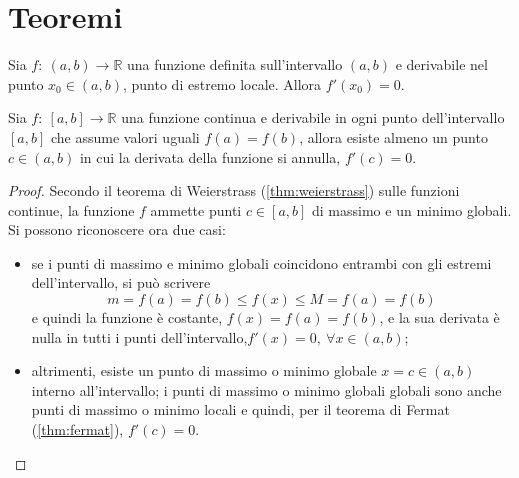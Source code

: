 \section{Teoremi}
\begin{theorem}\label{thm:fermat} Sia $f: \ (a,b) \rightarrow \mathbb{R}$ una funzione definita sull'intervallo $(a,b)$ e derivabile nel punto $x_0 \in (a,b)$, punto di estremo locale. Allora $f'(x_0) = 0$.
\end{theorem}

\begin{theorem}\label{thm:rolle} Sia $f: \ [a,b] \rightarrow \mathbb{R}$ una funzione continua e derivabile in ogni punto dell'intervallo $[a,b]$ che assume valori uguali $f(a) = f(b)$, allora esiste almeno un punto $c \in (a,b)$ in cui la derivata della funzione si annulla, $f'(c) = 0$.
\end{theorem}
\begin{proof}
    Secondo il teorema di Weierstrass (\ref{thm:weierstrass}) sulle funzioni continue, la funzione $f$ ammette punti $c \in [a,b]$ di massimo e un minimo globali. Si possono riconoscere ora due casi:
    \begin{itemize}
        \item se i punti di massimo e minimo globali coincidono entrambi con gli estremi dell'intervallo, si può scrivere
            \begin{equation} m = f(a) = f(b) \le f(x) \le M = f(a) = f(b) \end{equation}
                e quindi la funzione è costante, $f(x) = f(a) = f(b)$, e la sua derivata è nulla in tutti i punti dell'intervallo,$f'(x) = 0, \ \forall x \in (a,b)$;
            \item altrimenti, esiste un punto di massimo o minimo globale $x=c \in (a,b)$ interno all'intervallo; i punti di massimo o minimo globali globali sono anche punti di massimo o minimo locali e quindi, per il teorema di Fermat (\ref{thm:fermat}), $f'(c) = 0$.
    \end{itemize} 
\end{proof}

